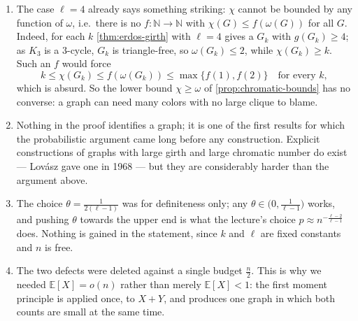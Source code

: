 \begin{remark}\hfill
    \begin{enumerate}[(1)]
        \item The case \(\ell = 4\) already says something striking: \(\chi\) cannot be bounded by any function of \(\omega\), i.e.\ there is no \(f \colon \mathbb{N} \to \mathbb{N}\) with \(\chi(G) \le f(\omega(G))\) for all \(G\). Indeed, for each \(k\) \autoref{thm:erdos-girth} with \(\ell = 4\) gives a \(G_k\) with \(g(G_k) \ge 4\); as \(K_3\) is a \(3\)-cycle, \(G_k\) is triangle-free, so \(\omega(G_k) \le 2\), while \(\chi(G_k) \ge k\). Such an \(f\) would force
            \[
                k \le \chi(G_k) \le f(\omega(G_k)) \le \max\{ f(1), f(2) \} \quad\text{for every } k,
            \]
            which is absurd. So the lower bound \(\chi \ge \omega\) of \autoref{prop:chromatic-bounds} has no converse: a graph can need many colors with no large clique to blame.
        \item Nothing in the proof identifies a graph; it is one of the first results for which the probabilistic argument came long before any construction. Explicit constructions of graphs with large girth and large chromatic number do exist --- Lov\'asz gave one in 1968 --- but they are considerably harder than the argument above.
        \item The choice \(\theta = \frac{1}{2(\ell-1)}\) was for definiteness only; any \(\theta \in \bigl( 0, \frac{1}{\ell-1} \bigr)\) works, and pushing \(\theta\) towards the upper end is what the lecture's choice \(p \approx n^{-\frac{\ell-2}{\ell-1}}\) does. Nothing is gained in the statement, since \(k\) and \(\ell\) are fixed constants and \(n\) is free.
        \item The two defects were deleted against a single budget \(\frac{n}{2}\). This is why we needed \(\mathbb{E}[X] = o(n)\) rather than merely \(\mathbb{E}[X] < 1\): the first moment principle is applied once, to \(X + Y\), and produces one graph in which both counts are small at the same time.
    \end{enumerate}
\end{remark}
